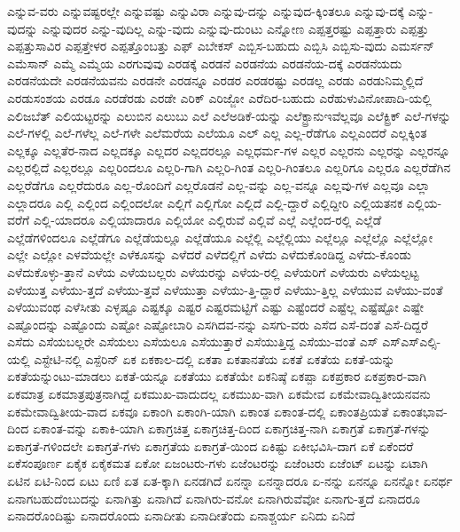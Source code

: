 {ಎನ್ನುವ-ವರು
ಎನ್ನುವಷ್ಟರಲ್ಲೇ
ಎನ್ನುವಷ್ಟು
ಎನ್ನುವಿರಾ
ಎನ್ನುವು-ದನ್ನು
ಎನ್ನುವುದ-ಕ್ಕಿಂತಲೂ
ಎನ್ನುವು-ದಕ್ಕೆ
ಎನ್ನು-ವುದನ್ನು
ಎನ್ನುವುದರ
ಎನ್ನು-ವುದಿಲ್ಲ
ಎನ್ನು-ವುದು
ಎನ್ನುವು-ದುಂಟು
ಎನ್ನೋಣ
ಎಪ್ಪತ್ತರಷ್ಟು
ಎಪ್ಪತ್ತಾರು
ಎಪ್ಪತ್ತು
ಎಪ್ಪತ್ತುಸಾವಿರ
ಎಪ್ಪತ್ತೇಳರ
ಎಪ್ಪತ್ತೊಂಬತ್ತು
ಎಫ್
ಎಬೇಕಸ್
ಎಬ್ಬಿಸ-ಬಹುದು
ಎಬ್ಬಿಸಿ
ಎಬ್ಬಿಸು-ವುದು
ಎಮರ್ಸನ್
ಎಮೆಸಾನ್
ಎಮ್ಮೆ
ಎಮ್ಮೆಯ
ಎರಗುವುವು
ಎರಡಕ್ಕೆ
ಎರಡನೆ
ಎರಡನೆಯ
ಎರಡನೆಯ-ದಕ್ಕೆ
ಎರಡನೆಯದು
ಎರಡನೆಯದೇ
ಎರಡನೆಯವನು
ಎರಡನೇ
ಎರಡನ್ನೂ
ಎರಡರ
ಎರಡರಷ್ಟು
ಎರಡಲ್ಲ
ಎರಡು
ಎರಡುನಿಮ್ಮಲ್ಲಿದೆ
ಎರಡುಸಂಶಯ
ಎರಡೂ
ಎರಡೆರಡು
ಎರಡೇ
ಎರಿಕ್
ಎರಿಜ್ಜೋ
ಎರೆದಿರ-ಬಹುದು
ಎರೆಹುಳುವಿನೋಪಾದಿ-ಯಲ್ಲಿ
ಎಲಿಜಬೆತ್
ಎಲಿಯಟ್ಟರನ್ನು
ಎಲುಬಿನ
ಎಲುಬು
ಎಲೆ
ಎಲೆಅಡಿಕೆ-ಯನ್ನು
ಎಲೆಕ್ಟ್ರಾನುಇವೆಲ್ಲವೂ
ಎಲೆಕ್ಟ್ರಿಕ್
ಎಲೆ-ಗಳನ್ನು
ಎಲೆ-ಗಳಲ್ಲಿ
ಎಲೆ-ಗಳೆಲ್ಲ
ಎಲೆ-ಗಳೇ
ಎಲೆಮರೆಯ
ಎಲೆಯೂ
ಎಲ್
ಎಲ್ಲ
ಎಲ್ಲ-ರೆಡೆಗೂ
ಎಲ್ಲಎಂದರೆ
ಎಲ್ಲಕ್ಕಿಂತ
ಎಲ್ಲಕ್ಕೂ
ಎಲ್ಲತೆರ-ನಾದ
ಎಲ್ಲದಕ್ಕೂ
ಎಲ್ಲದರ
ಎಲ್ಲದರಲ್ಲೂ
ಎಲ್ಲಧರ್ಮ-ಗಳ
ಎಲ್ಲರ
ಎಲ್ಲರನು
ಎಲ್ಲರನ್ನು
ಎಲ್ಲರನ್ನೂ
ಎಲ್ಲರಲ್ಲಿದೆ
ಎಲ್ಲರಲ್ಲೂ
ಎಲ್ಲರಿಂದಲೂ
ಎಲ್ಲರಿ-ಗಾಗಿ
ಎಲ್ಲರಿ-ಗಿಂತ
ಎಲ್ಲರಿ-ಗಿಂತಲೂ
ಎಲ್ಲರಿಗೂ
ಎಲ್ಲರೂ
ಎಲ್ಲರೆಡೆಗಿನ
ಎಲ್ಲರೆಡೆಗೂ
ಎಲ್ಲರೆದುರೂ
ಎಲ್ಲ-ರೊಂದಿಗೆ
ಎಲ್ಲರೊಡನೆ
ಎಲ್ಲ-ವನ್ನು
ಎಲ್ಲ-ವನ್ನೂ
ಎಲ್ಲವು-ಗಳ
ಎಲ್ಲವೂ
ಎಲ್ಲಾ
ಎಲ್ಲಾದರೂ
ಎಲ್ಲಿ
ಎಲ್ಲಿಂದ
ಎಲ್ಲಿಂದಲೋ
ಎಲ್ಲಿಗೆ
ಎಲ್ಲಿಗೋ
ಎಲ್ಲಿದೆ
ಎಲ್ಲಿ-ದ್ದಾರೆ
ಎಲ್ಲಿದ್ದೀರಿ
ಎಲ್ಲಿಯತನಕ
ಎಲ್ಲಿಯ-ವರೆಗೆ
ಎಲ್ಲಿ-ಯಾದರೂ
ಎಲ್ಲಿಯಾದಾರೂ
ಎಲ್ಲಿಯೋ
ಎಲ್ಲಿರುವೆ
ಎಲ್ಲಿವೆ
ಎಲ್ಲೆ
ಎಲ್ಲೆಂದ-ರಲ್ಲಿ
ಎಲ್ಲೆಡೆ
ಎಲ್ಲೆಡೆಗಳಿಂದಲೂ
ಎಲ್ಲೆಡೆಗೂ
ಎಲ್ಲೆಡೆಯಲ್ಲೂ
ಎಲ್ಲೆಡೆಯೂ
ಎಲ್ಲೆಲ್ಲಿ
ಎಲ್ಲೆಲ್ಲಿಯು
ಎಲ್ಲೆಲ್ಲೂ
ಎಲ್ಲೆಲ್ಲೊ
ಎಲ್ಲೆಲ್ಲೋ
ಎಲ್ಲೇ
ಎಲ್ಲೋ
ಎಳವೆಯಲ್ಲೇ
ಎಳೆಕೂಸನ್ನು
ಎಳೆದರೆ
ಎಳೆದಲ್ಲಿಗೆ
ಎಳೆದು
ಎಳೆದುಕೊಂಡಿದ್ದ
ಎಳೆದು-ಕೊಂಡು
ಎಳೆದುಕೊಳ್ಳು-ತ್ತಾನೆ
ಎಳೆಯ
ಎಳೆಯಬಲ್ಲರು
ಎಳೆಯರನ್ನು
ಎಳೆಯ-ರಲ್ಲಿ
ಎಳೆಯರಿಗೆ
ಎಳೆಯರು
ಎಳೆಯಲ್ಪಟ್ಟ
ಎಳೆಯುತ್ತ
ಎಳೆಯು-ತ್ತದೆ
ಎಳೆಯು-ತ್ತವೆ
ಎಳೆಯುತ್ತಾ
ಎಳೆಯು-ತ್ತಿ-ದ್ದಾರೆ
ಎಳೆಯು-ತ್ತಿಲ್ಲ
ಎಳೆಯುವ
ಎಳೆಯು-ವಂತೆ
ಎಳೆಯುವಂಥ
ಎಳೆಸೀತು
ಎಳ್ಳಷ್ಟೂ
ಎಷ್ಟಕ್ಕೂ
ಎಷ್ಟರ
ಎಷ್ಟರಮಟ್ಟಿಗೆ
ಎಷ್ಟು
ಎಷ್ಟೆಂದರೆ
ಎಷ್ಟೆಲ್ಲ
ಎಷ್ಟೆಷ್ಟೋ
ಎಷ್ಟೇ
ಎಷ್ಟೊಂದನ್ನು
ಎಷ್ಟೊಂದು
ಎಷ್ಟೋ
ಎಷ್ಟೋಬಾರಿ
ಎಸಗಿದವ-ನನ್ನು
ಎಸಗು-ವರು
ಎಸೆದ
ಎಸೆ-ದಂತೆ
ಎಸೆ-ದಿದ್ದರೆ
ಎಸೆದು
ಎಸೆಯಬಲ್ಲರೇ
ಎಸೆಯಲು
ಎಸೆಯಲೂ
ಎಸೆಯುತ್ತಾರೆ
ಎಸೆಯುತ್ತಿದ್ದ
ಎಸೆಯು-ವಂತೆ
ಎಸ್
ಎಸ್ಎಸ್ಎಲ್ಸಿ-ಯಲ್ಲಿ
ಎಸ್ಟೇಟಿ-ನಲ್ಲಿ
ಎಸ್ಪೆರಿನ್
ಏಕ
ಏಕಕಾಲ-ದಲ್ಲಿ
ಏಕತಾ
ಏಕತಾನತೆಯ
ಏಕತೆ
ಏಕತೆಯ
ಏಕತೆ-ಯನ್ನು
ಏಕತೆಯನ್ನುಂಟು-ಮಾಡಲು
ಏಕತೆ-ಯನ್ನೂ
ಏಕತೆಯು
ಏಕತೆಯೇ
ಏಕನಿಷ್ಠೆ
ಏಕಪ್ಪಾ
ಏಕಪ್ರಕಾರ
ಏಕಪ್ರಕಾರ-ವಾಗಿ
ಏಕಮಾತ್ರ
ಏಕಮಾತ್ರಪುತ್ರನಾಗಿದ್ದೆ
ಏಕಮುಖ-ವಾದುದಲ್ಲ
ಏಕಮುಖ-ವಾಗಿ
ಏಕಮೇವ
ಏಕಮೇವಾದ್ವಿತೀಯನವನು
ಏಕಮೇವಾದ್ವಿತೀಯ-ವಾದ
ಏಕವೂ
ಏಕಾಂಗಿ
ಏಕಾಂಗಿ-ಯಾಗಿ
ಏಕಾಂತ
ಏಕಾಂತ-ದಲ್ಲಿ
ಏಕಾಂತಪ್ರಿಯತೆ
ಏಕಾಂತಭಾವ-ದಿಂದ
ಏಕಾಂತ-ವನ್ನು
ಏಕಾಕಿ-ಯಾಗಿ
ಏಕಾಗ್ರಚಿತ್ತ
ಏಕಾಗ್ರಚಿತ್ತ-ದಿಂದ
ಏಕಾಗ್ರಚಿತ್ತ-ನಾಗಿ
ಏಕಾಗ್ರತೆ
ಏಕಾಗ್ರತೆ-ಗಳನ್ನು
ಏಕಾಗ್ರತೆ-ಗಳಿಂದಲೇ
ಏಕಾಗ್ರತೆ-ಗಳು
ಏಕಾಗ್ರತೆಯ
ಏಕಾಗ್ರತೆ-ಯಿಂದ
ಏಕಿಷ್ಟು
ಏಕೀಭವಿಸಿ-ದಾಗ
ಏಕೆ
ಏಕೆಂದರೆ
ಏಕೆಸಂಪೂರ್ಣ
ಏಕೈಕ
ಏಕೈಕಮತ
ಏಕೋ
ಏಜಂಟರು-ಗಳು
ಏಜೆಂಟರನ್ನು
ಏಜೆಂಟರು
ಏಜೆಂಟ್
ಏಟನ್ನು
ಏಟಾಗಿ
ಏಟಿನ
ಏಟಿ-ನಿಂದ
ಏಟು
ಏಣಿ
ಏತ
ಏತ-ಕ್ಕಾಗಿ
ಏನಡಗಿದೆ
ಏನನ್ನಾ
ಏನನ್ನಾದರೂ
ಏ-ನನ್ನು
ಏನನ್ನೂ
ಏನನ್ನೋ
ಏನರ್ಥ
ಏನಾಗಬಹುದೆಂಬುದನ್ನು
ಏನಾಗಿತ್ತು
ಏನಾಗಿದೆ
ಏನಾಗಿರು-ವನೋ
ಏನಾಗಿರುವೆವೋ
ಏನಾಗು-ತ್ತದೆ
ಏನಾದರೂ
ಏನಾದರೊಂದಿಷ್ಟು
ಏನಾದರೊಂದು
ಏನಾದೀತು
ಏನಾದೀತೆಂದು
ಏನಾಶ್ಚರ್ಯ
ಏನಿದು
ಏನಿದೆ
}
